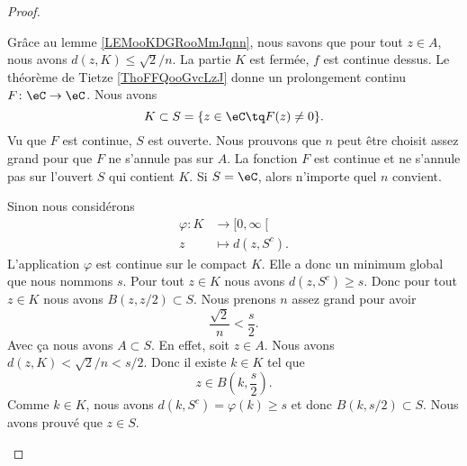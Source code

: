 \begin{proof}
\begin{subproof}
        Grâce au lemme \ref{LEMooKDGRooMmJqnn}, nous savons que pour tout \( z\in A\), nous avons \( d(z,K)\leq \sqrt{ 2 }/n\).
        \spitem[Prolongement]
        La partie \( K\) est fermée, \( f\) est continue dessus. Le théorème de Tietze \ref{ThoFFQooGvcLzJ} donne un prolongement continu \( F\colon \eC\to \eC\). Nous avons
        \begin{equation}
            K\subset S=\{ z\in \eC\tq F(z)\neq 0 \}.
        \end{equation}
        Vu que \( F\) est continue, \( S\) est ouverte.
        \spitem[Grand \( n\)]
        Nous prouvons que \( n\) peut être choisit assez grand pour que \( F\) ne s'annule pas sur \( A\). La fonction \( F\) est continue et ne s'annule pas sur l'ouvert \( S\) qui contient \( K\). Si \( S=\eC\), alors n'importe quel \( n\) convient.

         Sinon nous considérons
        \begin{equation}
            \begin{aligned}
                \varphi\colon K&\to \mathopen[ 0 , \infty \mathclose[ \\
                        z&\mapsto d(z,S^c). 
            \end{aligned}
        \end{equation}
        L'application \( \varphi\) est continue sur le compact \( K\). Elle a donc un minimum global que nous nommons \( s\). Pour tout \( z\in K\) nous avons \( d(z,S^c)\geq s\). Donc pour tout \( z\in K\) nous avons \( B(z,z/2)\subset S\). Nous prenons \( n\) assez grand pour avoir
        \begin{equation}        \label{EQooEWQYooWYsImg}
            \frac{ \sqrt{ 2 } }{ n }<\frac{ s }{ 2 }.
        \end{equation}
        Avec ça nous avons \( A\subset S\). En effet, soit \( z\in A\). Nous avons \( d(z,K)<\sqrt{ 2 }/n<s/2\). Donc il existe \( k\in K\) tel que 
        \begin{equation}
            z\in B(k,\frac{ s }{2}).
        \end{equation}
        Comme \( k\in K\), nous avons \( d(k,S^c)=\varphi(k)\geq s\) et donc \( B(k,s/2)\subset S\). Nous avons prouvé que \( z\in S\).


\end{subproof}
\end{proof}
